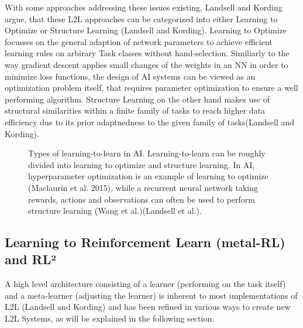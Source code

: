 \documentclass[letterpaper, 10 pt, conference]{ieeeconf}  %
\begin{document}
With some approaches addressing these issues existing, Landsell and Kording argue, that these L2L approaches can be categorized into 
either Learning to Optimize or Structure Learning (Landsell and Kording). Learning to Optimize focusses on the general 
adaption of network parameters to achieve efficient learning rules on arbirary Task classes without hand-selection. Similiarly to the way
gradient descent applies small changes of the weights in an NN in order to minimize loss functions, the design of AI systems can be viewed as
an optimization problem itself, that requires parameter optimization to ensure a well performing algorithm. Structure Learning 
on the other hand makes use of structural similarities within a finite family of tasks to reach higher data
efficiency due to its prior adaptnedness to the given family of tasks(Landsell and Kording). \newline

\begin{figure}[thpb]
        \centering
  \caption{Types of learning-to-learn in AI. Learning-to-learn can be roughly divided into learning to optimize and structure learning.
  In AI, hyperparameter optimization is
  an example of learning to optimize (Maclaurin et al. 2015), while a recurrent neural network taking rewards, actions and observations
   can often be used to perform structure learning (Wang et al.)(Landsell et al.).}
        \label{figurelabel}
     \end{figure}


\subsection{Learning to Reinforcement Learn (metal-RL) and RL²}

A high level architecture consisting of a learner (performing on the task itself) and a meta-learner (adjusting the learner) is
inherent to most implementations of L2L (Landsell and Kording) and has been refined in various ways to create new L2L Systems, as will be
explained in the following section.
\end{document}
